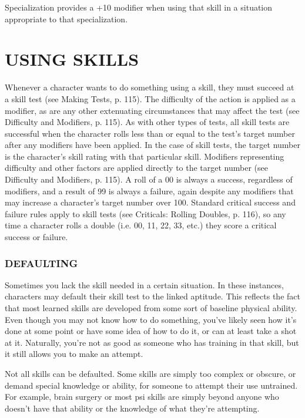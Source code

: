 Specialization provides a +10 modifier when
using that skill in a situation appropriate to that
specialization.




\section{USING SKILLS}
Whenever a character wants to do something using
a skill, they must succeed at a skill test (see Making
Tests, p. 115). The difficulty of the action is applied
as a modifier, as are any other extenuating circumstances that may affect the test (see Difficulty and
Modifiers, p. 115). As with other types of tests, all skill
tests are successful when the character rolls less than
or equal to the test’s target number after any modifiers have been applied. In the case of skill tests, the
target number is the character’s skill rating with that
particular skill. Modifiers representing difficulty and
other factors are applied directly to the target number
(see Difficulty and Modifiers, p. 115). A roll of a 00 is
always a success, regardless of modifiers, and a result
of 99 is always a failure, again despite any modifiers
that may increase a character’s target number over
100. Standard critical success and failure rules apply
to skill tests (see Criticals: Rolling Doubles, p. 116),
so any time a character rolls a double (i.e. 00, 11, 22,
33, etc.) they score a critical success or failure.


 \subsubsection{DEFAULTING}
Sometimes you lack the skill needed in a certain situation. In these instances, characters may default their
skill test to the linked aptitude. This reflects the fact
that most learned skills are developed from some sort
of baseline physical ability. Even though you may not
know how to do something, you’ve likely seen how
it’s done at some point or have some idea of how to
do it, or can at least take a shot at it. Naturally, you’re
not as good as someone who has training in that skill,
but it still allows you to make an attempt.

Not all skills can be defaulted. Some skills are
simply too complex or obscure, or demand special
knowledge or ability, for someone to attempt their
use untrained. For example, brain surgery or most psi
skills are simply beyond anyone who doesn’t have that
ability or the knowledge of what they’re attempting.

